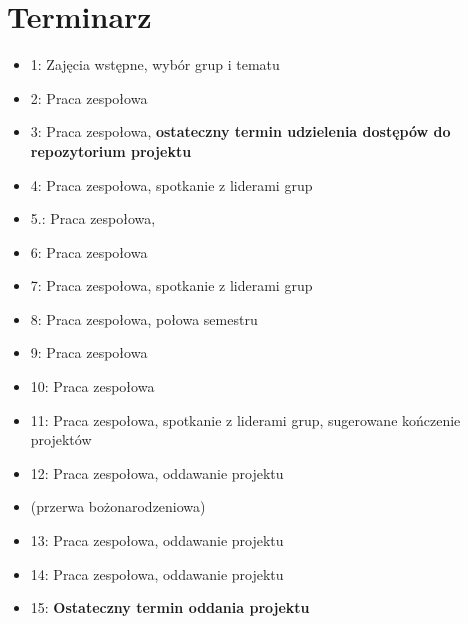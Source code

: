 \documentclass{article}
\begin{document}
	\section{Terminarz}
	\begin{itemize}
		\item 1: Zajęcia wstępne, wybór grup i tematu
		\item 2: Praca zespołowa
		\item 3: Praca zespołowa, \textbf{ostateczny termin udzielenia dostępów do repozytorium projektu}
		\item 4: Praca zespołowa, spotkanie z liderami grup
		\item 5.: Praca zespołowa,
		\item 6: Praca zespołowa
		\item 7: Praca zespołowa, spotkanie z liderami grup
		\item 8: Praca zespołowa, połowa semestru
		\item 9: Praca zespołowa
		\item 10: Praca zespołowa
		\item 11: Praca zespołowa, spotkanie z liderami grup, sugerowane kończenie projektów
		\item 12: Praca zespołowa, oddawanie projektu
		\item (przerwa bożonarodzeniowa)
		\item 13: Praca zespołowa, oddawanie projektu
		\item 14: Praca zespołowa, oddawanie projektu
		\item 15: \textbf{Ostateczny termin oddania projektu}
	\end{itemize}
\end{document}
